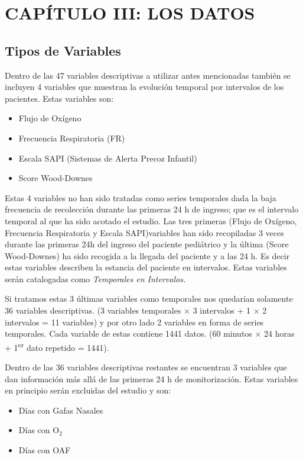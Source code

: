 \section{CAPÍTULO III: LOS DATOS}\label{sec:los-datos}

\subsection{Tipos de Variables}\label{sec:tiposdevariables}

Dentro de las 47 variables descriptivas a utilizar antes mencionadas también se incluyen 4 variables que muestran la evolución temporal por intervalos de los pacientes. Estas variables son:

\begin{itemize}
    \item Flujo de Oxígeno
    \item Frecuencia Respiratoria (FR)
    \item Escala SAPI (Sistemas de Alerta Precoz Infantil)
    \item Score Wood-Downes
\end{itemize}

Estas 4 variables no han sido tratadas como series temporales dada la baja frecuencia de recolección durante las primeras 24 h de ingreso; que es el intervalo temporal al que ha sido acotado el estudio. Las tres primeras (Flujo de Oxígeno, Frecuencia Respiratoria y Escala SAPI)variables han sido recopiladas 3 veces durante las primeras 24h del ingreso del paciente pediátrico y la última (Score Wood-Downes) ha sido recogida a la llegada del paciente y a las 24 h. Es decir estas variables describen la estancia del paciente en intervalos.  Estas variables serán catalogadas como \textit{Temporales en Intervalos.} 

Si tratamos estas 3 últimas variables como temporales nos quedarían solamente 36 variables descriptivas. (3 variables temporales $\times$ 3 intervalos + 1 $\times$ 2 intervalos = 11 variables) y por otro lado 2 variables en forma de series temporales. Cada variable de estas contiene 1441 datos. (60 minutos $\times$ 24 horas + 1\textsuperscript{er} dato repetido
= 1441).

Dentro de las 36 variables descriptivas restantes se encuentran 3 variables que dan información más allá de las primeras 24 h de monitorización. Estas variables en principio serán excluidas del estudio y son:

\begin{itemize}
    \item Días con Gafas Nasales
    \item Días con O$_2$
    \item Días con OAF
\end{itemize}

